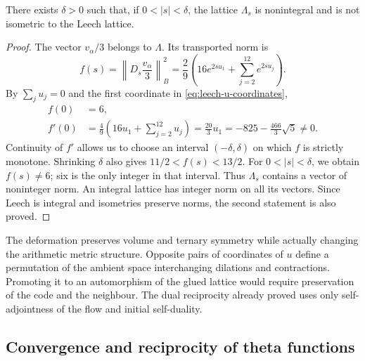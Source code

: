 \begin{proposition}
\label{prop:leech-nonintegral}
There exists \(\delta>0\) such that, if \(0<|s|<\delta\), the lattice
\(\Lambda_s\) is nonintegral and is not isometric to the Leech lattice.
\end{proposition}
\begin{proof}
The vector \(v_\alpha/3\) belongs to \(\Lambda\). Its transported
norm is
\begin{equation}
 f(s)=\left\|D_s\frac{v_\alpha}{3}\right\|_B^2
 =\frac29\left(16e^{2su_1}+
                       \sum_{j=2}^{12}e^{2su_j}\right).
 \label{eq:leech-witness}
\end{equation}
By \(\sum_j u_j=0\) and the first coordinate in
\eqref{eq:leech-u-coordinates},
\begin{equation}
\begin{split}
 f(0)&=6,\\
 f'(0)&=\frac49\left(16u_1+\sum_{j=2}^{12}u_j\right)
       =\frac{20}{3}u_1
       =-825-\frac{466}{3}\sqrt5\ne0.
\end{split}
\label{eq:leech-witness-derivative}
\end{equation}
Continuity of \(f'\) allows us to choose an interval
\((-\delta,\delta)\) on which \(f\) is strictly monotone.
Shrinking \(\delta\) also gives
\(11/2<f(s)<13/2\). For \(0<|s|<\delta\), we obtain \(f(s)\ne6\);
six is the only integer in that interval. Thus \(\Lambda_s\)
contains a vector of noninteger norm. An integral lattice has
integer norm on all its vectors. Since Leech is integral
and isometries preserve norms, the second statement is also
proved.
\end{proof}

The deformation preserves volume and ternary symmetry while
actually changing the arithmetic metric structure. Opposite
pairs of coordinates of \(u\) define a permutation of the ambient
space interchanging dilations and contractions. Promoting it
to an automorphism of the glued lattice would require preservation of the code
and the neighbour. The dual reciprocity already proved uses
only self-adjointness of the flow and initial self-duality.

\subsection{Convergence and reciprocity of theta functions}
\label{subsec:leech-theta}

